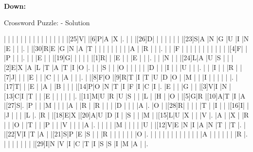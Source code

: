 \documentclass[12pt]{article}
\begin{document}
\begin{PuzzleClues}{\textbf{Down:}}
\end{PuzzleClues}
\newpage
\begin{center}
  \huge{Crossword Puzzle: - Solution}
\end{center}
\vspace{1.5cm}
\PuzzleSolution
\begin{Puzzle}{21}{21}
  |{}  |{}  |{}  |{}  |{}  |{}  |{}  |{}  |{}  |{}  |{}  |{}  |{}  |{}  |{}  |[25]V|{}  |[6]P|A   |X   |.
  |{}  |{}  |[26]D|{}  |{}  |{}  |{}  |{}  |{}  |{}  |[23]S|A   |N   |G   |U   |I   |N   |E   |{}  |{}  |.
  |{}  |[30]R|E   |G   |N   |A   |T   |{}  |{}  |{}  |{}  |{}  |{}  |{}  |{}  |A   |{}  |R   |{}  |{}  |.
  |{}  |{}  |F   |{}  |{}  |{}  |{}  |{}  |{}  |{}  |{}  |{}  |{}  |{}  |[4]F|{}  |{}  |P   |{}  |{}  |.
  |{}  |{}  |E   |{}  |{}  |[19]G|{}  |{}  |{}  |{}  |{}  |[1]R|{}  |{}  |E   |{}  |{}  |E   |{}  |{}  |.
  |{}  |{}  |N   |{}  |{}  |[24]L|A   |U   |S   |{}  |{}  |[2]E|X   |A   |L   |T   |A   |T   |I   |O   |.
  |{}  |{}  |S   |{}  |{}  |O   |{}  |{}  |{}  |{}  |{}  |D   |{}  |{}  |I   |{}  |{}  |U   |{}  |{}  |.
  |{}  |{}  |I   |{}  |{}  |R   |{}  |[7]J|{}  |{}  |{}  |E   |{}  |{}  |C   |{}  |{}  |A   |{}  |{}  |.
  |{}  |[8]F|O   |[9]R|T   |I   |T   |U   |D   |O   |{}  |M   |{}  |{}  |I   |{}  |{}  |{}  |{}  |{}  |.
  |[17]T|{}  |{}  |E   |{}  |A   |{}  |B   |{}  |{}  |{}  |[14]P|O   |N   |T   |I   |F   |I   |C   |I   |.
  |E   |{}  |{}  |G   |{}  |{}  |[3]V|I   |N   |[13]C|I   |T   |{}  |{}  |E   |{}  |{}  |{}  |{}  |{}  |.
  |[11]M|U   |R   |U   |S   |{}  |{}  |L   |{}  |H   |{}  |O   |{}  |[5]G|R   |[10]A|T   |I   |A   |[27]S|.
  |P   |{}  |{}  |M   |{}  |{}  |{}  |A   |{}  |R   |{}  |R   |{}  |{}  |{}  |D   |{}  |{}  |{}  |A   |.
  |O   |{}  |[28]R|{}  |{}  |{}  |{}  |T   |{}  |I   |{}  |{}  |[16]I|{}  |{}  |J   |{}  |{}  |{}  |L   |.
  |R   |{}  |[18]E|X   |[20]A|U   |D   |I   |{}  |S   |{}  |{}  |M   |{}  |[15]L|U   |X   |{}  |{}  |V   |.
  |A   |{}  |X   |{}  |R   |{}  |{}  |O   |{}  |T   |{}  |{}  |P   |{}  |{}  |V   |{}  |{}  |{}  |A   |.
  |{}  |{}  |{}  |{}  |M   |{}  |{}  |{}  |{}  |U   |{}  |[12]V|E   |N   |I   |A   |N   |T   |{}  |T   |.
  |{}  |[22]V|I   |T   |A   |{}  |[21]S|P   |E   |S   |{}  |{}  |R   |{}  |{}  |{}  |{}  |{}  |{}  |O   |.
  |{}  |{}  |{}  |{}  |{}  |{}  |{}  |{}  |{}  |{}  |{}  |{}  |A   |{}  |{}  |{}  |{}  |{}  |{}  |R   |.
  |{}  |{}  |{}  |{}  |{}  |{}  |{}  |[29]I|N   |V   |I   |C   |T   |I   |S   |S   |I   |M   |A   |{}  |.
\end{Puzzle}
\end{document}

